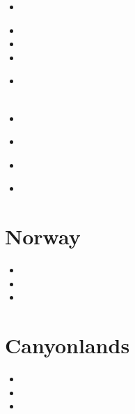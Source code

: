 \begin{scriptsize}
\begin{itemize}
\item[\twothousandtwo] 
 \\
\item[\twothousandeight] 
\item[\twothousandten] 
\item[\twothousandtwelve] 
\item[\twothousandthirteen] 
 \\
 \\
\item[\twothousandfifteen] 
 \\
\item[\twothousandsixteen] 
\item[\twothousandnineteen] 
 \\
\item[\twothousandtwentyone] 
\end{itemize}
\end{scriptsize}

\section{Norway} 

\begin{scriptsize}
\begin{itemize}
\item[\twothousandthirteen] 
\item[\twothousandfifteen] 
\item[\twothousandtwentytwo] 
\end{itemize}
\end{scriptsize}

\section{Canyonlands}

\begin{scriptsize}
\begin{itemize}
\item[\nineteenninetyfour]
\item[\twothousandtwo]
\item[\twothousandthree]
\end{itemize}
\end{scriptsize}

